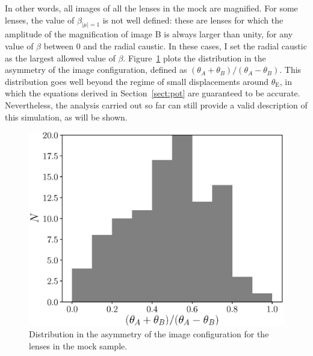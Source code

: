 \documentclass[usenatbib]{mnras}
\def\tein{\theta_{\mathrm{E}}}
\def\betamu{\beta_{|\mu|=1}}
\def\Sref#1{Section~\ref{#1}\xspace}
\def\Fref#1{Figure~\ref{#1}\xspace}
\begin{document}
In other words, all images of all the lenses in the mock are magnified.
For some lenses, the value of $\betamu$ is not well defined: these are lenses for which the amplitude of the magnification of image B is always larger than unity, for any value of $\beta$ between 0 and the radial caustic. In these cases, I set the radial caustic as the largest allowed value of $\beta$.
\Fref{fig:asymm} plots the distribution in the asymmetry of the image configuration, defined as $(\theta_A + \theta_B)/(\theta_A - \theta_B)$.
This distribution goes well beyond the regime of small displacements around $\tein$, in which the equations derived in \Sref{sect:pot} are guaranteed to be accurate.
Nevertheless, the analysis carried out so far can still provide a valid description of this simulation, as will be shown.
%
\begin{figure}
 \includegraphics[width=\columnwidth]{asymm_hist.eps}
 \caption{Distribution in the asymmetry of the image configuration for the lenses in the mock sample.}
 \label{fig:asymm}
\end{figure}
%
\end{document}
